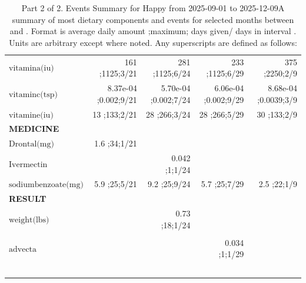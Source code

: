 \begin{table}[H]
\begin{tabular}{|l|r|r|r|r|}
$\textrm{vitamina(iu)}$&161 ;1125;3/21&281 ;1125;6/24&233 ;1125;6/29&375 ;2250;2/9\\
$\textrm{vitaminc(tsp)}$&8.37e-04 ;0.002;9/21&5.70e-04 ;0.002;7/24&6.06e-04 ;0.002;9/29&8.68e-04 ;0.0039;3/9\\
$\textrm{vitamine(iu)}$&13 ;133;2/21&28 ;266;3/24&28 ;266;5/29&30 ;133;2/9\\
{\bf MEDICINE}&&&&\\
$\textrm{Drontal(mg)}$&1.6 ;34;1/21&&&\\
$\textrm{Ivermectin}$&&0.042 ;1;1/24&&\\
$\textrm{sodiumbenzoate(mg)}$&5.9 ;25;5/21&9.2 ;25;9/24&5.7 ;25;7/29&2.5 ;22;1/9\\
{\bf RESULT}&&&&\\
$\textrm{weight(lbs)}$&&0.73 ;18;1/24&&\\
&&&&\\
$\textrm{advecta}$&&&0.034 ;1;1/29&\\
&&&&\\
&&&&\\
&&&&\\
&&&&\\
&&&&\\
\hline
\end{tabular}
\caption{Part 2 of 2.  Events Summary for Happy   from 2025-09-01 to 2025-12-09A summary of most dietary components and events  for selected months between \mjmdateminln and \mjmdatemaxln. Format is average daily amount ;maximum; days given/ days in interval . Units are arbitrary except where noted. Any  superscripts are defined as follows:  \mjmsuperscriptsln}
\end{table}
